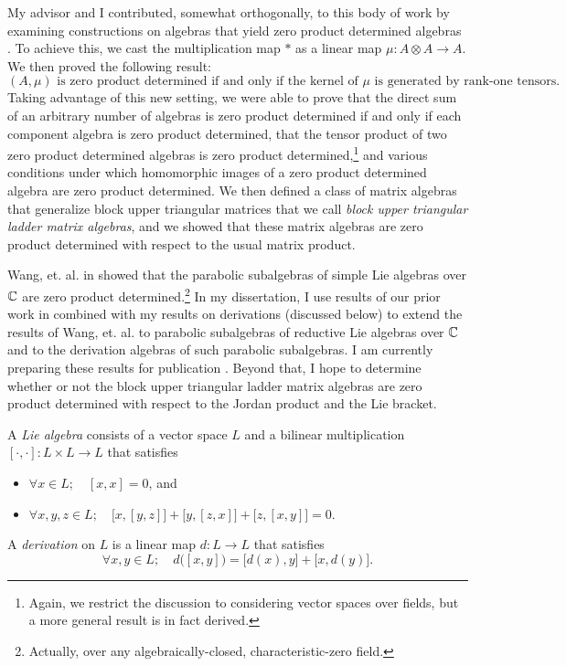 \documentclass[11pt]{article}
\begin{document}
My advisor and I contributed, somewhat orthogonally, to this body of work by examining constructions on algebras that yield zero product determined algebras \cite{brice2015zero}. To achieve this, we cast the multiplication map $\ast$ as a linear map $\mu : A \otimes A \to A$. We then proved the following result:
$$(A, \mu) \text{ is zero product determined if and only if the kernel of $\mu$ is generated by rank-one tensors.}$$
Taking advantage of this new setting, we were able to prove that the direct sum of an arbitrary number of algebras is zero product determined if and only if each component algebra is zero product determined, that the tensor product of two zero product determined algebras is zero product determined,\footnote{Again, we restrict the discussion to considering vector spaces over fields, but a more general result is in fact derived.} and various conditions under which homomorphic images of a zero product determined algebra are zero product determined. We then defined a class of matrix algebras that generalize block upper triangular matrices that we call \emph{block upper triangular ladder matrix algebras}, and we showed that these matrix algebras are zero product determined with respect to the usual matrix product.

Wang, et. al. in \cite{wang2011class} showed that the parabolic subalgebras of simple Lie algebras over $\mathbb{C}$ are zero product determined.\footnote{Actually, over any algebraically-closed, characteristic-zero field.} In my dissertation, I use results of our prior work in \cite{brice2015zero} combined with my results on derivations (discussed below) to extend the results of Wang, et. al. to parabolic subalgebras of reductive Lie algebras over $\mathbb{C}$ and to the derivation algebras of such parabolic subalgebras. I am currently preparing these results for publication \cite{brice0000note}. Beyond that, I hope to determine whether or not the block upper triangular ladder matrix algebras are zero product determined with respect to the Jordan product and the Lie bracket.



A \emph{Lie algebra} consists of a vector space $L$ and a bilinear multiplication $[\cdot,\cdot]: L \times L \to L$ that satisfies
\begin{itemize}
	\item[] $\forall x \in L;\quad [x,x] = 0$, and
	\item[] $\forall x,y,z \in L;\quad \big[x,[y,z]\big]+\big[y,[z,x]\big]+\big[z,[x,y]\big]=0$.
\end{itemize}
A \emph{derivation} on $L$ is a linear map $d: L \to L$ that satisfies
$$\forall x,y \in L;\quad d\big([x,y]\big) = \big[d(x),y\big] + \big[x,d(y)\big]\text{.}$$
\end{document}
